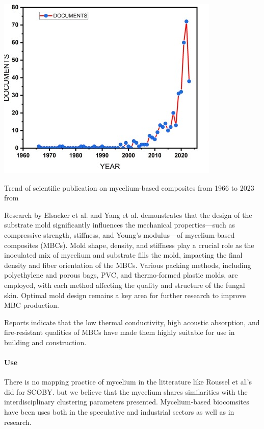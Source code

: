 \begin{marginfigure}
    \centering
    \includegraphics{images/publication on mycelium-based.png}    
    \caption{Trend of scientific publication on mycelium-based composites from 1966 to 2023 from \cite{alaneme2023mycelium}}
    \label{fig:trend}
\end{marginfigure}

Research by Elsacker et al.\cite{elsacker2019mechanical} and Yang et al.\cite{yang2017physical} demonstrates that the design of the substrate mold significantly influences the mechanical properties—such as compressive strength, stiffness, and Young’s modulus—of mycelium-based composites (MBCs). Mold shape, density, and stiffness play a crucial role as the inoculated mix of mycelium and substrate fills the mold, impacting the final density and fiber orientation of the MBCs. Various packing methods, including polyethylene and porous bags, PVC, and thermo-formed plastic molds, are employed, with each method affecting the quality and structure of the fungal skin. Optimal mold design remains a key area for further research to improve MBC production.

Reports indicate that the low thermal conductivity, high acoustic absorption, and fire-resistant qualities of MBCs have made them highly suitable for use in building and construction. \cite{ghazvinian2019mycelium}

\paragraph{Use}

There is no mapping practice of mycelium in the litterature like Roussel et al.'s \cite{roussel2023processes} did for SCOBY. but we believe that the mycelium shares similarities with the interdisciplinary clustering parameters presented.
Mycelium-based biocomsites have been uses both in the speculative and industrial sectors as well as in research.

